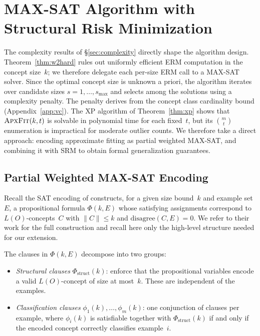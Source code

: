 \documentclass[accepted]{uai2026} %
\theoremstyle{definition}
\theoremstyle{remark}
\newcommand{\AF}{\textsc{ApxFit}}
\newcommand{\disagree}{\mathrm{disagree}}
\begin{document}
\section{MAX-SAT Algorithm with Structural Risk Minimization}\label{sec:algorithm}

The complexity results of \S\ref{sec:complexity} directly
shape the algorithm design. Theorem~\ref{thm:w2hard} rules out
uniformly efficient ERM computation in the concept size~$k$; we
therefore delegate each per-size ERM call to a MAX-SAT solver.
Since the optimal concept size is unknown a priori, the algorithm
iterates over candidate sizes $s = 1, \ldots, s_{\max}$ and
selects among the solutions using a complexity penalty.
The penalty derives from the concept
class cardinality bound (Appendix~\ref{app:vc}).
The XP algorithm of Theorem~\ref{thm:xp} shows
that $\AF(k,t)$ is solvable in polynomial time for each fixed~$t$,
but its $\binom{m}{t}$ enumeration is impractical for moderate
outlier counts. We therefore take a direct approach: encoding approximate fitting as
partial weighted MAX-SAT, and combining it with
SRM to obtain formal generalization
guarantees.

\subsection{Partial Weighted MAX-SAT Encoding}\label{sec:algorithm:maxsat}

Recall the SAT encoding of
\citet{DBLP:conf/semweb/FunkJV25} constructs, for a given size
bound~$k$ and example set~$E$, a propositional formula
$\Phi(k, E)$ whose satisfying assignments correspond to
$L(O)$-concepts~$C$ with $\|C\| \leq k$ and
$\disagree(C, E) = 0$. We refer to their
work for the full construction and
recall here only the high-level structure needed for our extension.

The clauses in $\Phi(k, E)$ decompose into two
groups:
%
\begin{itemize}[leftmargin=*,itemsep=1pt,topsep=2pt]
  \item \emph{Structural clauses} $\Phi_{\mathrm{struct}}(k)$:
    enforce that the propositional variables encode a valid
    $L(O)$-concept of size at most~$k$. These are independent of
    the examples.
  \item \emph{Classification clauses}
    $\phi_1(k), \ldots, \phi_m(k)$: one conjunction of clauses per
    example, where $\phi_i(k)$ is satisfiable together with
    $\Phi_{\mathrm{struct}}(k)$ if and only if the encoded concept
    correctly classifies example~$i$.
\end{itemize}
\end{document}
